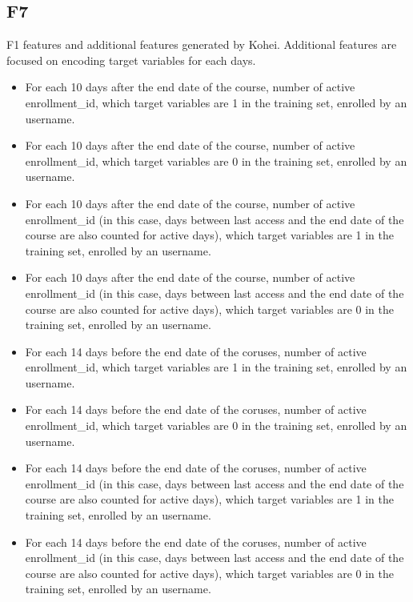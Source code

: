 \subsection{F7}

F1 features and additional features generated by Kohei. Additional features are focused on encoding target variables for each days.

\begin{itemize}
  \setlength\itemsep{0em}
  \item For each 10 days after the end date of the course, number of active enrollment\_id, which target variables are 1 in the training set, enrolled by an username.
  \item For each 10 days after the end date of the course, number of active enrollment\_id, which target variables are 0 in the training set, enrolled by an username.
  \item For each 10 days after the end date of the course, number of active enrollment\_id (in this case, days between last access and the end date of the course are also counted for active days), which target variables are 1 in the training set, enrolled by an username.
  \item For each 10 days after the end date of the course, number of active enrollment\_id (in this case, days between last access and the end date of the course are also counted for active days), which target variables are 0 in the training set, enrolled by an username.
  \item For each 14 days before the end date of the coruses, number of active enrollment\_id, which target variables are 1 in the training set, enrolled by an username.
  \item For each 14 days before the end date of the coruses, number of active enrollment\_id, which target variables are 0 in the training set, enrolled by an username.
  \item For each 14 days before the end date of the coruses, number of active enrollment\_id (in this case, days between last access and the end date of the course are also counted for active days), which target variables are 1 in the training set, enrolled by an username.
  \item For each 14 days before the end date of the coruses, number of active enrollment\_id (in this case, days between last access and the end date of the course are also counted for active days), which target variables are 0 in the training set, enrolled by an username.
\end{itemize}
